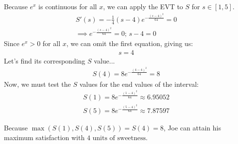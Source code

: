Because $e^x$ is continuous for all $x$, we can apply the EVT to $S$ for $s\in[1, 5]$.
\begin{align*}
	S'(s)=-\frac{1}{4}(s-4)e^{-\frac{(s-4)^2}{64}}=0\\
	\implies e^{-\frac{(s-4)^2}{64}}=0\text{; }s-4=0
\end{align*}
Since $e^x > 0$ for all $x$, we can omit the first equation, giving us:
\begin{align*}
	s = 4
\end{align*}
Let's find its corresponding $S$ value...
\begin{align*}
	S(4) = 8e^{-\frac{(4-4)^2}{64}} = 8
\end{align*}
Now, we must test the $S$ values for the end values of the interval:
\begin{align*}
	S(1) = 8e^{-\frac{(1-4)^2}{64}} \approx 6.95052\\
	S(5) = 8e^{-\frac{(5-4)^2}{64}} \approx 7.87597
\end{align*}

Because $\max(S(1), S(4), S(5)) = S(4) = 8$, Joe can attain his maximum satisfaction with $\boxed{4\text{ units of sweetness}}$.